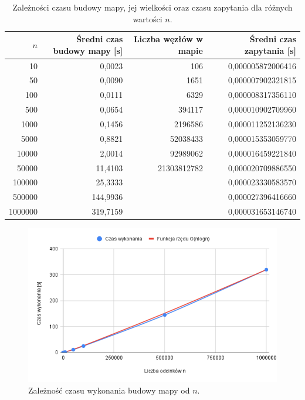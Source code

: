\documentclass[11pt,a4paper]{article}
\begin{document}
\begin{table}[H]
    \centering
    \begin{tabular}{|r|r|r|r|}
    \hline
        $n$ & Średni czas budowy mapy [\si{s}] & Liczba węzłów w mapie & Średni czas zapytania [\si{s}]\\ \hline
        10 & 0,0023 & 106 & 0,000005872006416 \\ \hline
        50 & 0,0090 & 1651 & 0,000007902321815 \\ \hline
        100 & 0,0111 & 6329 & 0,000008317356110 \\ \hline
        500 & 0,0654 & 394117 & 0,000010902709960 \\ \hline
        1000 & 0,1456 & 2196586 & 0,000011252136230 \\ \hline
        5000 & 0,8821 & 52038433 & 0,000015353059770 \\ \hline
        10000 & 2,0014 & 92989062 & 0,000016459221840 \\ \hline
        50000 & 11,4103 & 21303812782 & 0,000020709886550 \\ \hline
        100000 & 25,3333 & ~ & 0,000023330583570 \\ \cline{1-2} \cline{4-4}
        500000 & 144,9936 & ~ & 0,000027396416660 \\ \cline{1-2} \cline{4-4}
        1000000 & 319,7159 & ~ & 0,000031653146740 \\ \cline{1-2} \cline{4-4}
    \end{tabular}
    \caption{Zależności czasu budowy mapy, jej wielkości 
    oraz czasu zapytania dla różnych wartości $n$.}
\end{table}

\begin{figure}[H]
    \centering
    \includegraphics[scale=0.46]{./res/figs/build_times_graph.png}
    \caption{Zależność czasu wykonania budowy mapy od $n$.}
\end{figure}
\end{document}
